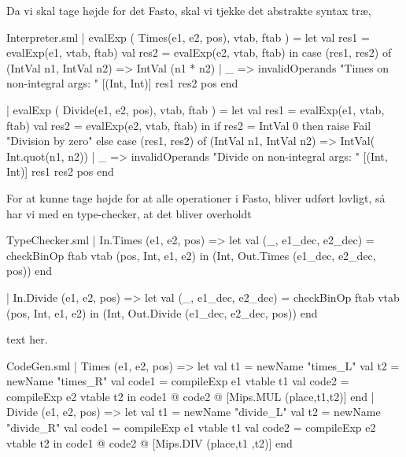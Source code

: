 \documentclass[11pt,a4paper,oneside]{report}
\begin{document}
Da vi skal tage højde for det Fasto, skal vi tjekke det abstrakte syntax træ,

\begin{code}[firstnumber=160]{Interpreter.sml}
| evalExp ( Times(e1, e2, pos), vtab, ftab ) =
    let
      val res1   = evalExp(e1, vtab, ftab)
      val res2   = evalExp(e2, vtab, ftab)
    in
      case (res1, res2) of
          (IntVal n1, IntVal n2) => IntVal (n1 * n2)
        | _ => invalidOperands 
            "Times on non-integral args: " 
                [(Int, Int)] res1 res2 pos
    end

| evalExp ( Divide(e1, e2, pos), vtab, ftab ) =
    let
      val res1   = evalExp(e1, vtab, ftab)
      val res2   = evalExp(e2, vtab, ftab)
    in
      if res2 = IntVal 0 then raise Fail "Division by zero"
        else
          case (res1, res2) of
            (IntVal n1, IntVal n2) => IntVal( Int.quot(n1, n2))
            | _ => invalidOperands 
                "Divide on non-integral args: " 
                    [(Int, Int)] res1 res2 pos
    end
\end{code}

For at kunne tage højde for at alle operationer i Fasto, bliver udført lovligt, så har vi med en type-checker, at det bliver overholdt

\begin{code}[firstnumber=160]{TypeChecker.sml}
| In.Times (e1, e2, pos)
  => let val (_, e1_dec, e2_dec) = 
            checkBinOp ftab vtab (pos, Int, e1, e2)
     in (Int,
         Out.Times (e1_dec, e2_dec, pos))
     end

| In.Divide (e1, e2, pos)
  => let val (_, e1_dec, e2_dec) = 
            checkBinOp ftab vtab (pos, Int, e1, e2)
     in (Int,
         Out.Divide (e1_dec, e2_dec, pos))
     end
\end{code}

text her.

\newpage

\begin{code}[firstnumber=133]{CodeGen.sml}
  | Times (e1, e2, pos) =>
      let val t1 = newName "times_L"
          val t2 = newName "times_R"
          val code1 = compileExp e1 vtable t1
          val code2 = compileExp e2 vtable t2
      in  code1 @ code2 @ [Mips.MUL (place,t1,t2)]
      end
  | Divide (e1, e2, pos) =>
      let val t1 = newName "divide_L"
          val t2 = newName "divide_R"
          val code1 = compileExp e1 vtable t1
          val code2 = compileExp e2 vtable t2
      in  code1 @ code2 @ [Mips.DIV (place,t1 ,t2)]
      end
\end{code}
\end{document}
